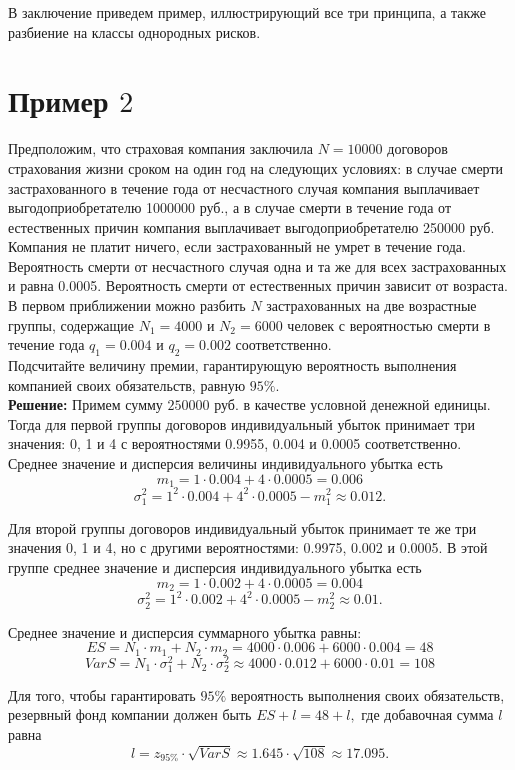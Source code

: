 \documentclass[12pt,a4paper]{article}
\begin{document}
В заключение приведем пример, иллюстрирующий все три принципа, а также разбиение на классы однородных рисков.\\

\section{ Пример $2$}
 Предположим, что страховая компания заключила $N=10000$ договоров страхования жизни сроком на один год на следующих условиях:
в случае смерти застрахованного в течение года от несчастного случая компания выплачивает выгодоприобретателю 1000000 руб., а в случае смерти в течение года от естественных причин компания выплачивает выгодоприобретателю 250000 руб. Компания не платит ничего, если застрахованный не умрет в течение года. Вероятность смерти от несчастного случая одна и та же для всех застрахованных и равна 0.0005. Вероятность смерти от естественных причин зависит от возраста. В первом приближении можно разбить $N$ застрахованных на две возрастные группы, содержащие $N_1 = 4000$ и $N_2=6000$ человек с вероятностью смерти в течение года $q_1=0.004 $ и $q_2=0.002$ соответственно.\\
Подсчитайте величину премии, гарантирующую вероятность выполнения компанией своих обязательств, равную $95\%.$\\

{\bf Решение:} Примем сумму $250000$ руб. в качестве условной денежной единицы. Тогда для первой группы договоров индивидуальный убыток принимает три значения: 0, 1 и 4 с вероятностями 0.9955, 0.004 и 0.0005 соответственно. Среднее значение и дисперсия величины индивидуального убытка есть
$$m_1 = 1\cdot 0.004 + 4\cdot 0.0005 = 0.006$$
$$\sigma_1^2 = 1^2 \cdot 0.004 + 4^2 \cdot 0.0005 - m_1^2 \approx 0.012.$$

Для второй группы договоров индивидуальный убыток принимает те же три значения 0, 1 и 4, но с другими вероятностями: 0.9975, 0.002 и 0.0005.  В этой группе среднее значение и дисперсия индивидуального убытка есть
$$m_2 = 1\cdot 0.002 + 4\cdot 0.0005 = 0.004$$
$$\sigma_2^2 = 1^2\cdot 0.002 + 4^2\cdot 0.0005 - m_2^2 \approx 0.01.$$

Среднее значение и дисперсия суммарного убытка равны:
$$ES = N_1 \cdot m_1 + N_2 \cdot m_2 = 4000 \cdot 0.006 + 6000 \cdot 0.004 = 48$$
$$VarS = N_1\cdot \sigma_1^2 + N_2\cdot \sigma_2^2 \approx 4000\cdot 0.012 + 6000\cdot 0.01 = 108$$

Для того, чтобы гарантировать $95\%$ вероятность выполнения своих обязательств, резервный фонд компании должен быть $ES+l = 48+l,$ 
где добавочная сумма $l$  равна
$$l = z_{95\%} \cdot \sqrt{VarS} \approx 1.645 \cdot \sqrt{108} \approx 17.095.$$
\end{document}
